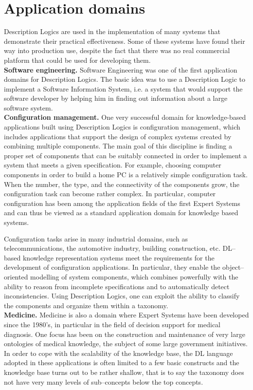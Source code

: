 \documentclass[a4paper, 11pt, oneside]{duthesis}
\begin{document}
\newpage

\section{Application domains}
Description Logics are used in the implementation of many systems that demonstrate their practical effectiveness. Some of these systems have found their way into production use, despite the fact that there was no real commercial platform that could be used for developing them.\\

\textbf{Software engineering.} Software Engineering was one of the first application domains for Description Logics. The basic idea was to use a Description Logic to implement a Software Information System, i.e. a system that would support the software developer by helping him in finding out information about a large software system.\\

\textbf{Configuration management.} One very successful domain for knowledge-based applications built using Description Logics is configuration management, which includes applications that support the design of complex systems created by combining multiple components.
The main goal of this discipline is finding a proper set of components that can be suitably connected in order to implement a system that meets a given specification.
For example, choosing computer components in order to build a home PC is a relatively simple configuration task.
When the number, the type, and the connectivity of the components grow, the configuration task can become rather complex.
In particular, computer configuration has been among the application fields of the first Expert Systems and can thus be viewed as a standard application domain for knowledge based systems.

Configuration tasks arise in many industrial domains, such as telecommunications, the automotive industry, building construction, etc.
DL--based knowledge representation systems meet the requirements for the development of configuration applications.
In particular, they enable the object--oriented modelling of system components, which combines powerfully with the ability to reason from incomplete specifications and to automatically detect inconsistencies.
Using Description Logics, one can exploit the ability to classify the components and organize them within a taxonomy.\\

\textbf{Medicine.} Medicine is also a domain where Expert Systems have been developed since the 1980’s, in particular in the field of decision support for medical diagnosis. One focus has been on the construction and maintenance of very large ontologies of medical knowledge, the subject of some large government initiatives.
In order to cope with the scalability of the knowledge base, the DL language adopted in these applications is often limited to a few basic constructs and the knowledge base turns out to be rather shallow, that is to say the taxonomy does not have very many levels of sub--concepts below the top concepts.\\
\end{document}
